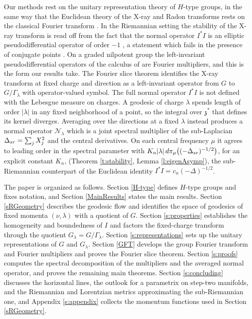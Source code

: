 \documentclass[11pt]{amsart}
\theoremstyle{plain}
\theoremstyle{definition}
\theoremstyle{remark}
\numberwithin{equation}{section}
\def\fz{\mathfrak{z}}
\def\cN{\mathcal{N}}
\numberwithin{equation}{section}
\begin{document}
Our methods rest on the unitary representation theory of $H$-type groups, in the same way that the Euclidean theory of the X-ray and Radon transforms rests on the classical Fourier transform \cite{helgasonIntegralGeometryRadon2011}. In the Riemannian setting the stability of the X-ray transform is read off from the fact that the normal operator $I^*I$ is an elliptic pseudodifferential operator of order $-1$ \cite{stefanovBoundaryRigidityStability2005a}, a statement which fails in the presence of conjugate points \cite{stefanovGeodesicXrayTransform2012, monardGeodesicRayTransform2015, holmanAttenuatedGeodesicXray2018}. On a graded nilpotent group the left-invariant pseudodifferential operators of the calculus of \cite{fischerQuantizationNilpotentLie2016} are Fourier multipliers, and this is the form our results take. The Fourier slice theorem identifies the X-ray transform at fixed charge and direction as a left-invariant operator from $G$ to $G/\Gamma_\lambda$ with operator-valued symbol. The full normal operator $I^*I$ is not defined with the Lebesgue measure on charges. A geodesic of charge $\lambda$ spends length of order $|\lambda|$ in any fixed neighborhood of a point, so the integral over $\fz^*$ that defines its kernel diverges. Averaging over the directions at a fixed $\lambda$ instead produces a normal operator $\cN_\lambda$ which is a joint spectral multiplier of the sub-Laplacian $\Delta_{\rm{sr}}=\sum_j X_j^2$ and the central derivatives. On each central frequency $\mu$ it agrees to leading order in the spectral parameter with $K_n|\lambda|\, d\pi_\mu\big((-\Delta_{\rm{sr}})^{-1/2}\big)$, for an explicit constant $K_n$, (Theorem \ref{t:stability}, Lemma \ref{l:eigenAsymp}), the sub-Riemannian counterpart of the Euclidean identity $I^*I=c_n(-\Delta)^{-1/2}$.


The paper is organized as follows. Section \ref{H-type} defines $H$-type groups and fixes notation, and Section \ref{MainResults} states the main results. Section \ref{sRGeometry} describes the geodesic flow and identifies the space of geodesics of fixed momenta $(\nu, \lambda)$ with a quotient of $G$. Section \ref{s:properties} establishes the homogeneity and boundedness of $I$ and factors the fixed-charge transform through the quotient $G_\lambda=G/\Gamma_\lambda$. Section \ref{s:representations} sets up the unitary representations of $G$ and $G_\lambda$. Section \ref{GFT} develops the group Fourier transform and Fourier multipliers and proves the Fourier slice theorem. Section \ref{s:proofs} computes the spectral decomposition of the multipliers and the averaged normal operator, and proves the remaining main theorems. Section \ref{s:concluding} discusses the horizontal lines, the outlook for a parametrix on step-two manifolds, and the Riemannian and Lorentzian metrics approximating the sub-Riemannian one, and Appendix \ref{s:appendix} collects the momentum functions used in Section \ref{sRGeometry}.
\end{document}
